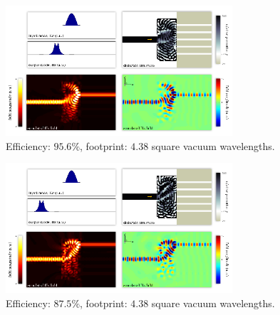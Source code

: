 \documentclass[letterpaper,10pt]{article}
\begin{document}
\begin{appendix}
\begin{figure}[htb]
    \centering
    \includegraphics[width=0.75\textwidth]{20}
    \caption{
        Efficiency: $95.6\%$,
        footprint: $4.38$ square vacuum wavelengths.
        }
\end{figure}

\begin{figure}[htb]
    \centering
    \includegraphics[width=0.75\textwidth]{21}
    \caption{
        Efficiency: $87.5\%$,
        footprint: $4.38$ square vacuum wavelengths.
        }
\end{figure}
\clearpage
\end{appendix}
\end{document}
